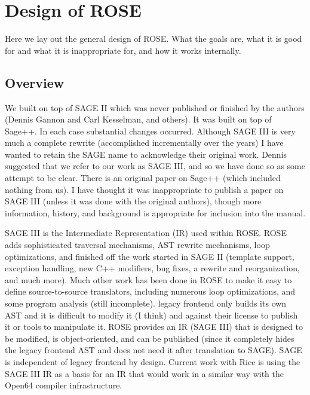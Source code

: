 
\chapter{ Design of ROSE }
   Here we lay out the general design of ROSE.  What the goals are, what it is
good for and what it is inappropriate for, and how it works internally.

\section{Overview}
   We built on top of SAGE II which was never published or finished by the authors
(Dennis Gannon and Carl Kesselman, and others).  It was built on top of
Sage++.  In each case substantial changes occurred.  Although SAGE III
is very much a complete rewrite (accomplished incrementally over the years)
I have wanted to retain the SAGE name to acknowledge their original work.
Dennis suggested that we refer to our work as SAGE III, and so we
have done so as some attempt to be clear.  There is an original paper on Sage++
(which included nothing from us).  I have thought it was inappropriate
to publish a paper on SAGE III (unless it was done with the original authors),
though more information, history, and background is appropriate for inclusion 
into the manual.

   SAGE III is the Intermediate Representation (IR) used within ROSE.  
ROSE adds sophisticated traversal mechanisms, AST rewrite mechanisms, loop
optimizations, and finished off the work started in SAGE II (template support, exception
handling, new C++ modifiers, bug fixes, a rewrite and reorganization, and much more).
Much other work has 
been done in ROSE to make it easy to define source-to-source translators, including 
numerous loop optimizations, and some program analysis (still incomplete).
legacy frontend only builds its own AST and it is difficult to modify it (I think)
and against their license to publish it or tools to manipulate it.  ROSE provides
an IR (SAGE III) that is designed to be modified, is object-oriented, and can be published
(since it completely hides the legacy frontend AST and does not need it after translation to
SAGE).  SAGE is independent of legacy frontend by design. Current work with Rice is using the 
SAGE III IR as a basis for an IR that would work in a similar way with the 
Open64 compiler infrastructure.

